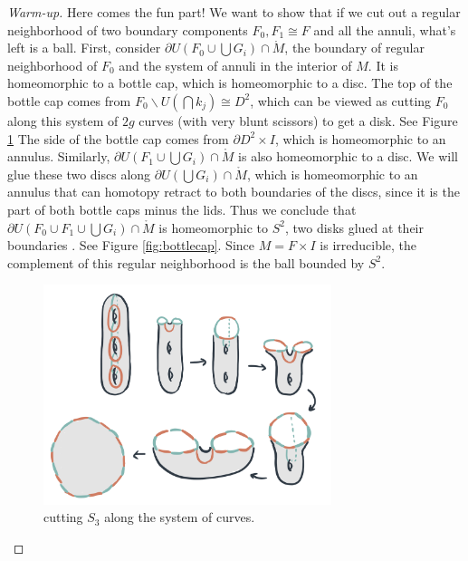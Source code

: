 \documentclass[12pt]{amsart}
\theoremstyle{remark}
\begin{document}
\begin{proof}[Warm-up]
	 Here comes the fun part! We want to show that if we cut out a regular neighborhood of two boundary components \(F_0, F_1 \cong F\) and all the annuli, what's left is a ball. First, consider 
	 \(\partial U(F_0 \cup \bigcup G_i) \cap \mathring{M}\), the boundary of regular neighborhood of \(F_0\) and the system of annuli in the interior of \(M\). It is homeomorphic to a bottle cap, which is homeomorphic to a disc. The top of the bottle cap comes from \(F_0 \backslash U(\bigcap k_j) \cong D^2\), which can be viewed as cutting \(F_0\) along this system of \(2g\) curves (with very blunt scissors) to get a disk. 
	 See Figure \ref{fig:disc}
	 The side of the bottle cap comes from \(\partial D^2 \times I\), which is homeomorphic to an annulus. Similarly, \(\partial U(F_1 \cup \bigcup G_i) \cap \mathring{M}\) is also homeomorphic to a disc. We will glue these two discs along \(\partial U(\bigcup G_i) \cap \mathring{M}\), which is{} homeomorphic to an annulus that can homotopy retract to both boundaries of the discs, since it is the part of both bottle caps minus the lids. Thus we conclude that \(\partial U(F_0 \cup F_1 \cup \bigcup G_i) \cap \mathring{M}\) is homeomorphic to \(S^2\), two disks glued at their boundaries . See Figure \ref{fig:bottlecap}. Since \(M = F\times I\) is irreducible, the complement of this regular neighborhood is the ball bounded by \(S^2\). 

	 \begin{figure}
	 	\centering
	 	\includegraphics[width = 0.75\textwidth]{IMG3.png}
	 	\caption{cutting \(S_3\) along the system of curves.}
	 	\label{fig:disc}
	 \end{figure}


\end{proof}
\end{document}

